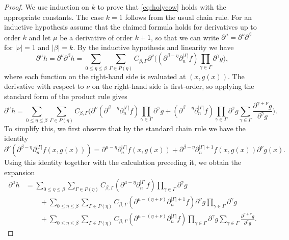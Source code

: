 \documentclass[oneside,hidelinks,indentfirst,10pt]{book}
\begin{document}
\begin{proof}
We use induction on \(k\) to prove that \eqref{eq:holycow} holds with the appropriate constants. The case \(k=1\) follows from the usual chain rule. For an inductive hypothesis assume that the claimed formula holds for derivatives up to order \(k\) and let \(\mu\) be a derivative of order \(k+1\), so that we can write \(\partial^\mu=\partial^\nu\partial^\beta\) for \(|\nu|=1\) and \(|\beta|=k\). By the inductive hypothesis and linearity we have
\[
    \partial^\mu h=\partial^\nu\partial^\beta h=\sum_{0\leq \eta\leq\beta}\sum_{\Gamma\in P(\eta)}C_{\beta,\Gamma}\partial^\nu\bigg((\partial^{\beta-\eta}\partial^{|\Gamma|}_n f)\prod_{\gamma\in\Gamma}\partial^\gamma g\bigg),
\]
where each function on the right-hand side is evaluated at \((x,g(x))\). The derivative with respect to \(\nu\) on the right-hand side is first-order, so applying the standard form of the product rule gives
\[
    \partial^\mu h=\sum_{0\leq\eta\leq\beta}\sum_{\Gamma\in P(\eta)}C_{\beta,\Gamma}\bigg(\partial^\nu(\partial^{\beta-\eta}\partial^{|\Gamma|}_nf)\prod_{\gamma\in\Gamma}\partial^\gamma g+(\partial^{\beta-\eta}\partial^{|\Gamma|}_n f)\prod_{\gamma\in\Gamma}\partial^\gamma g\sum_{\gamma\in\Gamma}\frac{\partial^{\gamma+\nu }g}{\partial^\gamma g}\bigg).
\]
To simplify this, we first observe that by the standard chain rule we have the identity
\[
    \partial^\nu(\partial^{\beta-\eta}\partial^{|\Gamma|}_n f(x,g(x)))=\partial^{\mu-\eta}\partial^{|\Gamma|}_n f(x,g(x))+\partial^{\beta-\eta}\partial^{|\Gamma|+1}_nf(x,g(x))\partial^\nu g(x).
\]
Using this identity together with the calculation preceding it, we obtain the expansion
\begin{equation}\label{eq:lots}
\begin{split}
    \partial^\mu h&=\sum_{0\leq\eta\leq\beta}\sum_{\Gamma\in P(\eta)}C_{\beta,\Gamma}(\partial^{\mu-\eta}\partial^{|\Gamma|}_n f)\prod_{\gamma\in\Gamma}\partial^\gamma g\\
    &\qquad+\sum_{0\leq\eta\leq\beta}\sum_{\Gamma\in P(\eta)}C_{\beta,\Gamma}(\partial^{\mu-(\eta+\nu)}\partial^{|\Gamma|+1}_nf)\partial^\nu g\prod_{\gamma\in\Gamma}\partial^\gamma g\\
    &\qquad+\sum_{0\leq\eta\leq\beta}\sum_{\Gamma\in P(\eta)}C_{\beta,\Gamma}(\partial^{\mu-(\eta+\nu)}\partial^{|\Gamma|}_n f)\prod_{\gamma\in\Gamma}\partial^\gamma g\sum_{\gamma\in\Gamma}\frac{\partial^{\gamma+\nu }g}{\partial^\gamma g}.
\end{split}
\end{equation}



\end{proof}
\end{document}
